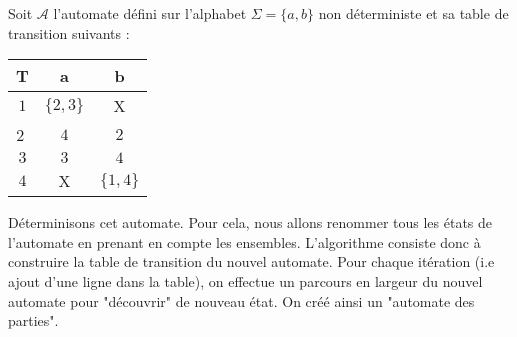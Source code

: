 \begin{example}[Déterminisation]
    Soit $ \mathcal{A}$ l'automate défini sur l'alphabet $\Sigma = \{ a,b \}$ non déterministe et sa table 
    de transition suivants : 

    \begin{center}
        \begin{minipage}{0.45\textwidth} %
        \end{minipage}%
        \hfill 
        \begin{minipage}{0.45\textwidth} %
            \begin{tabular}{c|c|c}
                T & a & b \\ \hline 
                $1$ & $\{2,3\}$ & X \\ \hline 
                \textcircled{2} & $4$ & $2$ \\ \hline 
                $3$ & $3$ & $4$ \\ \hline 
                $4$ & X & $\{1,4\}$ 
            \end{tabular}
        \end{minipage}
    \end{center}

    Déterminisons cet automate. Pour cela, nous allons renommer tous les états de l'automate en prenant en 
    compte les ensembles. 
    L'algorithme consiste donc à construire la table de transition du nouvel automate. 
    Pour chaque itération (i.e ajout d'une ligne dans la table), on effectue un parcours en largeur du nouvel automate 
    pour "découvrir" de nouveau état. On créé ainsi un "automate des parties". 


\end{example}
